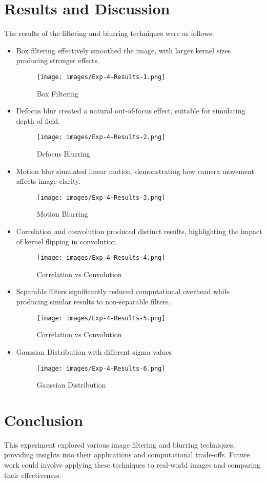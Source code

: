 \documentclass{report}
\begin{document}
\section{Results and Discussion}
The results of the filtering and blurring techniques were as follows:
\begin{itemize}
    \item Box filtering effectively smoothed the image, with larger kernel sizes producing stronger effects.
    \begin{figure}[h!]
    \centering
    \texttt{[image: images/Exp-4-Results-1.png]} %
    \caption{Box Filtering}
    \label{fig:exp-4-results}
\end{figure}
    \item Defocus blur created a natural out-of-focus effect, suitable for simulating depth of field.
    \begin{figure}[h!]
    \centering
    \texttt{[image: images/Exp-4-Results-2.png]} %
    \caption{Defocus Blurring}
    \label{fig:exp-4-results}
\end{figure}
    \item Motion blur simulated linear motion, demonstrating how camera movement affects image clarity.
    \begin{figure}[h!]
    \centering
    \texttt{[image: images/Exp-4-Results-3.png]} %
    \caption{Motion Blurring}
    \label{fig:exp-4-results}
\end{figure}
    \item Correlation and convolution produced distinct results, highlighting the impact of kernel flipping in convolution.
        \begin{figure}[h!]
    \centering
    \texttt{[image: images/Exp-4-Results-4.png]} %
    \caption{Correlation vs Convolution}
    \label{fig:exp-4-results}
\end{figure}
    \item Separable filters significantly reduced computational overhead while producing similar results to non-separable filters.
    \begin{figure}[h!]
    \centering
    \texttt{[image: images/Exp-4-Results-5.png]} %
    \caption{Correlation vs Convolution}
    \label{fig:exp-4-results}
\end{figure}
    \item Gaussian Distribution with different sigma values
        \begin{figure}[h!]
    \centering
    \texttt{[image: images/Exp-4-Results-6.png]} %
    \caption{Gaussian Distribution}
    \label{fig:exp-4-results}
\end{figure}
\end{itemize}

\section{Conclusion}
This experiment explored various image filtering and blurring techniques, providing insights into their applications and computational trade-offs. Future work could involve applying these techniques to real-world images and comparing their effectiveness.
\end{document}
